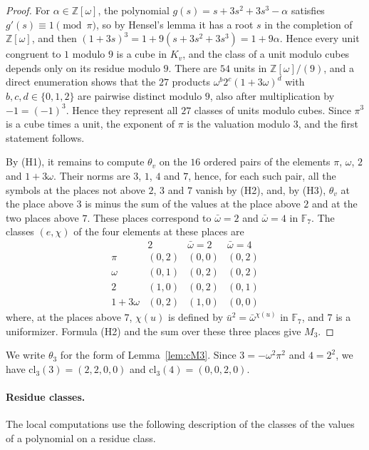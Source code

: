 \documentclass[11pt]{article}
\newcommand{\Z}{\mathbb{Z}}
\newcommand{\F}{\mathbb{F}}
\begin{document}
\begin{proof}
For $\alpha\in\Z[\omega]$, the polynomial $g(s)=s+3s^2+3s^3-\alpha$ satisfies $g'(s)\equiv1\pmod\pi$, so by Hensel's lemma it has a root $s$ in the completion of $\Z[\omega]$, and then $(1+3s)^3=1+9(s+3s^2+3s^3)=1+9\alpha$. Hence every unit congruent to $1$ modulo $9$ is a cube in $K_v$, and the class of a unit modulo cubes depends only on its residue modulo $9$. There are $54$ units in $\Z[\omega]/(9)$, and a direct enumeration shows that the $27$ products $\omega^b2^c(1+3\omega)^d$ with $b,c,d\in\{0,1,2\}$ are pairwise distinct modulo $9$, also after multiplication by $-1=(-1)^3$. Hence they represent all $27$ classes of units modulo cubes. Since $\pi^3$ is a cube times a unit, the exponent of $\pi$ is the valuation modulo $3$, and the first statement follows.

By (H1), it remains to compute $\theta_v$ on the $16$ ordered pairs of the elements $\pi$, $\omega$, $2$ and $1+3\omega$. Their norms are $3$, $1$, $4$ and $7$, hence, for each such pair, all the symbols at the places not above $2$, $3$ and $7$ vanish by (H2), and, by (H3), $\theta_v$ at the place above $3$ is minus the sum of the values at the place above $2$ and at the two places above $7$. These places correspond to $\bar\omega=2$ and $\bar\omega=4$ in $\F_7$. The classes $(e,\chi)$ of the four elements at these places are
\[
\begin{array}{c|ccc}
 & 2 & \bar\omega=2 & \bar\omega=4\\\hline
\pi & (0,2) & (0,0) & (0,2)\\
\omega & (0,1) & (0,2) & (0,2)\\
2 & (1,0) & (0,2) & (0,1)\\
1+3\omega & (0,2) & (1,0) & (0,0)
\end{array}
\]
where, at the places above $7$, $\chi(u)$ is defined by $\bar u^2=\bar\omega^{\chi(u)}$ in $\F_7$, and $7$ is a uniformizer. Formula (H2) and the sum over these three places give $M_3$.
\end{proof}

We write $\theta_3$ for the form of Lemma~\ref{lem:cM3}. Since $3=-\omega^2\pi^2$ and $4=2^2$, we have $\mathrm{cl}_3(3)=(2,2,0,0)$ and $\mathrm{cl}_3(4)=(0,0,2,0)$.

\paragraph{Residue classes.} The local computations use the following description of the classes of the values of a polynomial on a residue class.
\end{document}
